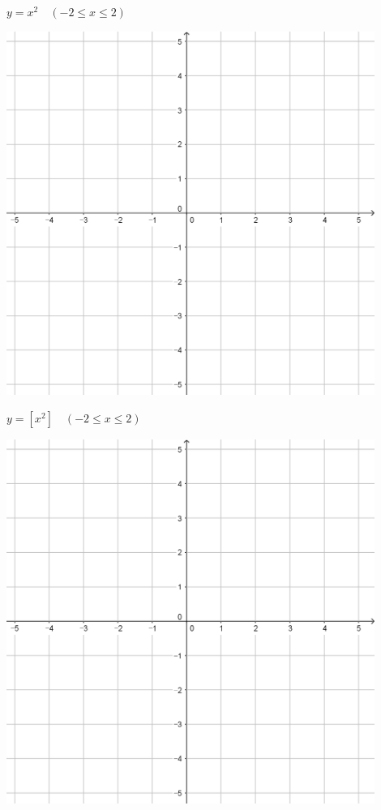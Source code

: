 \documentclass[a4paper]{oblivoir}
\begin{document}
\begin{minipage}{0.45\textwidth}\centering
\(y=x^2\quad(-2\le x\le2)\)
\par\bigskip\includegraphics[width=0.9\textwidth]{55}
\end{minipage}
\begin{minipage}{0.45\textwidth}\centering
\(y=[x^2]\quad(-2\le x\le2)\)
\par\bigskip\includegraphics[width=0.9\textwidth]{55}
\end{minipage}\bigskip\bigskip\par
\end{document}

